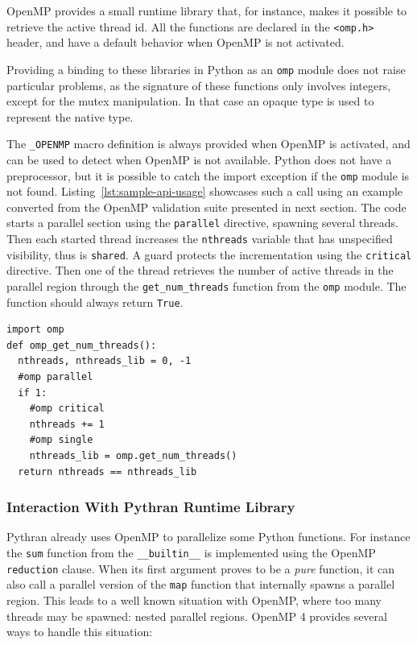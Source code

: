 \documentclass[conference]{IEEEtran}
\begin{document}
OpenMP provides a small runtime library that, for instance, makes it possible to
retrieve the active thread id. All the functions are declared in the
\texttt{<omp.h>} header, and have a default behavior when OpenMP is not
activated.

Providing a binding to these libraries in Python as an \texttt{omp} module does
not raise particular problems, as the signature of these functions only involves
integers, except for the mutex
manipulation. In that case an opaque type is used to represent the native type.

The \texttt{\_OPENMP} macro definition is always provided when OpenMP is
activated, and can be used to detect when OpenMP is not available. Python does
not have a preprocessor, but it is possible to catch the import exception if the
\texttt{omp} module is not found. Listing~\ref{lst:sample-api-usage} showcases
such a call using an example converted from the OpenMP validation suite
presented in next section. The code starts a parallel section using the
\texttt{parallel} directive, spawning several threads. Then each started thread
increases the \texttt{nthreads} variable that has unspecified visibility, thus
is \texttt{shared}. A guard protects the incrementation using the
\texttt{critical} directive. Then one of the thread retrieves the number of
active threads in the parallel region through the \texttt{get\_num\_threads}
function from the \texttt{omp} module. The function should always return
\texttt{True}.

\begin{lstlisting}[float,label={lst:sample-api-usage},caption={Example of
        OpenMP API usage from Python.}]
import omp
def omp_get_num_threads():
  nthreads, nthreads_lib = 0, -1
  #omp parallel
  if 1:
    #omp critical
    nthreads += 1
    #omp single
    nthreads_lib = omp.get_num_threads()
  return nthreads == nthreads_lib
\end{lstlisting}

\subsubsection{Interaction With Pythran Runtime Library}

Pythran already uses OpenMP to parallelize some Python functions. For instance
the \texttt{sum} function from the \texttt{\_\_builtin\_\_} is implemented using
the OpenMP \texttt{reduction} clause. When its first argument proves to be a
\emph{pure} function, it can also call a parallel version of the
\texttt{map} function that internally spawns a parallel region. This leads to a
well known situation with OpenMP, where too many threads may be spawned: nested
parallel regions. OpenMP 4 provides several ways to handle this situation:
\end{document}
